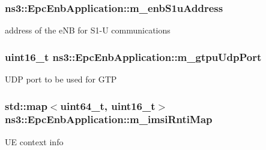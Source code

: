 \subsubsection[{\texorpdfstring{m\+\_\+enb\+S1u\+Address}{m_enbS1uAddress}}]{ ns3\+::\+Epc\+Enb\+Application\+::m\+\_\+enb\+S1u\+Address\hspace{0.3cm}{\ttfamily [private]}}\hypertarget{classns3_1_1EpcEnbApplication_a0edb76abc19ab0ed92f5086c2fad0d1f}{}\label{classns3_1_1EpcEnbApplication_a0edb76abc19ab0ed92f5086c2fad0d1f}
address of the e\+NB for S1-\/U communications 
\subsubsection[{\texorpdfstring{m\+\_\+gtpu\+Udp\+Port}{m_gtpuUdpPort}}]{\setlength{\rightskip}{0pt plus 5cm}uint16\+\_\+t ns3\+::\+Epc\+Enb\+Application\+::m\+\_\+gtpu\+Udp\+Port\hspace{0.3cm}{\ttfamily [private]}}\hypertarget{classns3_1_1EpcEnbApplication_ab28f95f379316c6d236f119ee65123c0}{}\label{classns3_1_1EpcEnbApplication_ab28f95f379316c6d236f119ee65123c0}
U\+DP port to be used for G\+TP 
\subsubsection[{\texorpdfstring{m\+\_\+imsi\+Rnti\+Map}{m_imsiRntiMap}}]{\setlength{\rightskip}{0pt plus 5cm}std\+::map$<$uint64\+\_\+t, uint16\+\_\+t$>$ ns3\+::\+Epc\+Enb\+Application\+::m\+\_\+imsi\+Rnti\+Map\hspace{0.3cm}{\ttfamily [private]}}\hypertarget{classns3_1_1EpcEnbApplication_a9e51467fe97aafabac7d51f056850fea}{}\label{classns3_1_1EpcEnbApplication_a9e51467fe97aafabac7d51f056850fea}
UE context info 
